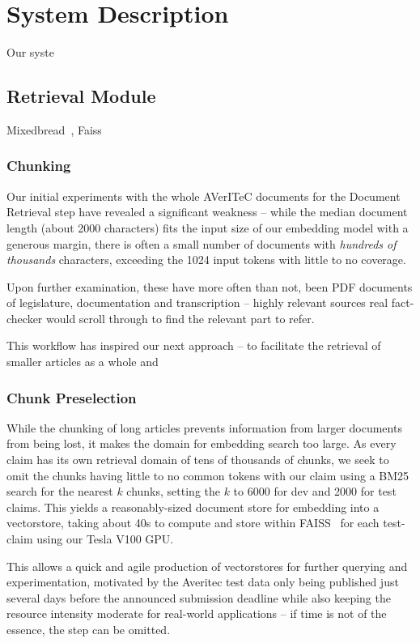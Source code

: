 
\section{System Description}
\label{sec:system}
Our syste

\subsection{Retrieval Module}
Mixedbread~\cite{li-li-2024-aoe,emb2024mxbai}, Faiss~\cite{douze2024faiss,johnson2019billion}

\subsubsection{Chunking}
Our initial experiments with the whole AVerITeC documents for the Document Retrieval step have revealed a significant weakness -- while the median document length (about 2000 characters) fits the input size of our embedding model with a generous margin, there is often a small number of documents with \textit{hundreds of thousands} characters, exceeding the 1024 input tokens with little to no coverage.

Upon further examination, these have more often than not, been PDF documents of legislature, documentation and transcription -- highly relevant sources real fact-checker would scroll through to find the relevant part to refer. 

This workflow has inspired our next approach -- to facilitate the retrieval of smaller articles as a whole and 

\subsubsection{Chunk Preselection}
While the chunking of long articles prevents information from larger documents from being lost, it makes the domain for embedding search too large.
As every claim has its own retrieval domain of tens of thousands of chunks, we seek to omit the chunks having little to no common tokens with our claim using a BM25 search for the nearest $k$ chunks, setting the $k$ to 6000 for dev and 2000 for test claims. 
This yields a reasonably-sized document store for embedding into a vectorstore, taking about 40s to compute and store within FAISS~\cite{douze2024faiss} for each test-claim using our Tesla V100 GPU.

This allows a quick and agile production of vectorstores for further querying and experimentation, motivated by the Averitec test data only being published just several days before the announced submission deadline while also keeping the resource intensity moderate for real-world applications -- if time is not of the essence, the step can be omitted.

